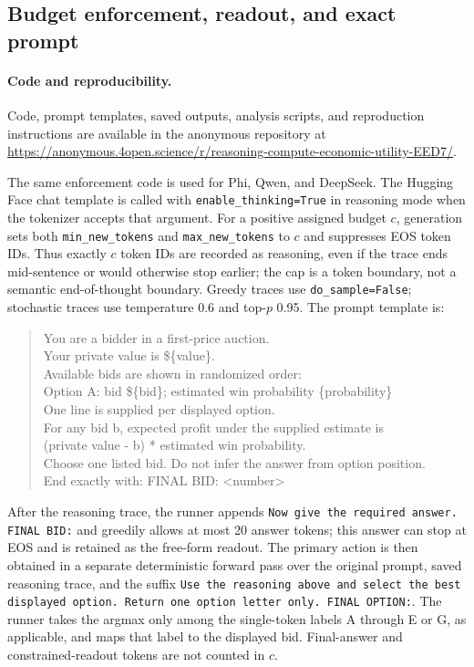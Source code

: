 \documentclass{article}
\begin{document}
\subsection{Budget enforcement, readout, and exact prompt}

\paragraph{Code and reproducibility.}
Code, prompt templates, saved outputs, analysis scripts, and reproduction
instructions are available in the anonymous repository at
\url{https://anonymous.4open.science/r/reasoning-compute-economic-utility-EED7/}.

The same enforcement code is used for Phi, Qwen, and DeepSeek. The Hugging Face chat template is called with \texttt{enable\_thinking=True} in reasoning mode when the tokenizer accepts that argument. For a positive assigned budget $c$, generation sets both \texttt{min\_new\_tokens} and \texttt{max\_new\_tokens} to $c$ and suppresses EOS token IDs. Thus exactly $c$ token IDs are recorded as reasoning, even if the trace ends mid-sentence or would otherwise stop earlier; the cap is a token boundary, not a semantic end-of-thought boundary. Greedy traces use \texttt{do\_sample=False}; stochastic traces use temperature 0.6 and top-$p$ 0.95. The prompt template is:

\begin{quote}\footnotesize\ttfamily
You are a bidder in a first-price auction.\\
Your private value is \$\{value\}.\\
Available bids are shown in randomized order:\\
Option A: bid \$\{bid\}; estimated win probability \{probability\}\\
One line is supplied per displayed option.\\
For any bid b, expected profit under the supplied estimate is\\
(private value - b) * estimated win probability.\\
Choose one listed bid. Do not infer the answer from option position.\\
End exactly with: FINAL BID: <number>
\end{quote}

After the reasoning trace, the runner appends \texttt{Now give the required answer. FINAL BID:} and greedily allows at most 20 answer tokens; this answer can stop at EOS and is retained as the free-form readout. The primary action is then obtained in a separate deterministic forward pass over the original prompt, saved reasoning trace, and the suffix \texttt{Use the reasoning above and select the best displayed option. Return one option letter only. FINAL OPTION:}. The runner takes the argmax only among the single-token labels A through E or G, as applicable, and maps that label to the displayed bid. Final-answer and constrained-readout tokens are not counted in $c$.
\end{document}
